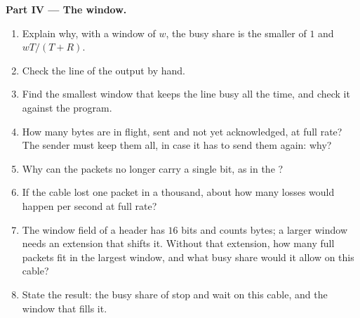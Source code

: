 \begin{problem}
\medskip\noindent\textbf{Part IV --- The window.}
\begin{enumerate}[resume]
  \item Explain why, with a window of $w$, the busy share is the smaller of $1$ and $wT / (T + R)$.
  \item Check the line  of the output by hand.
  \item Find the smallest window that keeps the line busy all the time, and check it against the program.
  \item How many bytes are in flight, sent and not yet acknowledged, at full rate? The sender must keep them all, in
    case it has to send them again: why?
  \item Why can the packets no longer carry a single bit, as in the ?
  \item If the cable lost one packet in a thousand, about how many losses would happen per second at full rate?
  \item The window field of a  header has $16$ bits and counts bytes; a larger window needs an extension that
    shifts it. Without that extension, how many full packets fit in the largest window, and what busy share would it
    allow on this cable?
  \item State the result: the busy share of stop and wait on this cable, and the window that fills it.
\end{enumerate}
\end{problem}
